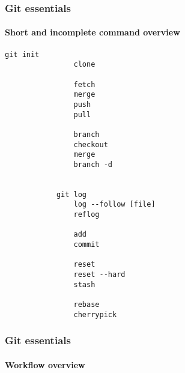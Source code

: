 \documentclass{beamer}
\newcommand{\adjustimg}{%
  \checkoddpage%
  \ifoddpage\hspace*{\dimexpr\evensidemargin-\oddsidemargin}\else\hspace*{-\dimexpr\evensidemargin-\oddsidemargin}\fi%
}
\newcommand{\centerimg}[2][width=\textwidth]{%
  \makebox[\textwidth]{\adjustimg\texttt{[image: \#2]}}%
}
\begin{document}
    \begin{comment}
    \begin{frame}
        \begin{tikzpicture}
            \gitDAG[grow right sep = 2em]{
                A -- B -- {
                  C,
                  D -- E,
                }
            };
            \gittag
                [v0p1]      %
                {v0.1}      %
                {above=of A}%
                {A}         %
            \gitremotebranch
                [originmaster]
                {origin/master}
                {above=of C}
                {C}
            \gitbranch
                {master}
                {above=of E}
                {E}
            \gitHEAD
                {above=of master}
                {master}
        \end{tikzpicture}
    \end{frame}
    \end{comment}
    \begin{frame}[fragile]
        \frametitle{Git essentials}
        \framesubtitle{Short and incomplete command overview}
        \begin{multicols}{2}
        \begin{lstlisting}[gobble=12]
            git init                
                clone

                fetch
                merge
                push
                pull

                branch
                checkout
                merge
                branch -d


            git log                
                log --follow [file]
                reflog

                add
                commit

                reset
                reset --hard
                stash

                rebase
                cherrypick
        \end{lstlisting}
        \end{multicols}
    \end{frame}
    \begin{frame}
        \frametitle{Git essentials}
        \framesubtitle{Workflow overview}
        \noindent\centerimg[width=\textwidth]{workflow.png}
    \end{frame}
\end{document}
